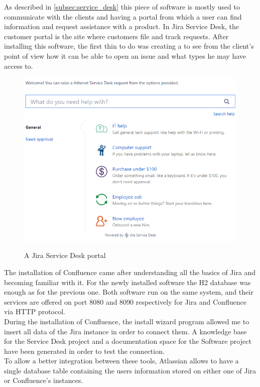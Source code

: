 	As described in \ref{subsec:service_desk} this piece of software is mostly used to communicate with the clients and having a portal from which a user can find information and request assistance with a product.
	In Jira Service Desk, the customer portal is the site where customers file and track requests.
	After installing this software, the first thin to do was creating a  to see from the client's point of view how it can be able to open an issue and what types he may have access to.
	\begin{figure}[H]
		\centering
		\includegraphics[width=\textwidth]{resources/Annotation2019-07-24170249}\\
		\caption{A Jira Service Desk portal}
	\end{figure}
	The installation of Confluence came after understanding all the basics of Jira and becoming familiar with it.
	For the newly installed software the H2 database was enough as for the previous one.
	Both software run on the same system, and their services are offered on port 8080 and 8090 respectively for Jira and Confluence via HTTP protocol.\\
	During the installation of Confluence, the install wizard program allowed me to insert all data of the Jira instance in order to connect them.
	A knowledge base for the Service Desk project and a documentation space for the Software project have been generated in order to test the connection.\\
	To allow a better integration between these tools, Atlassian allows to have a single database table containing the users information stored on either one of Jira or Confluence's instances.\\
